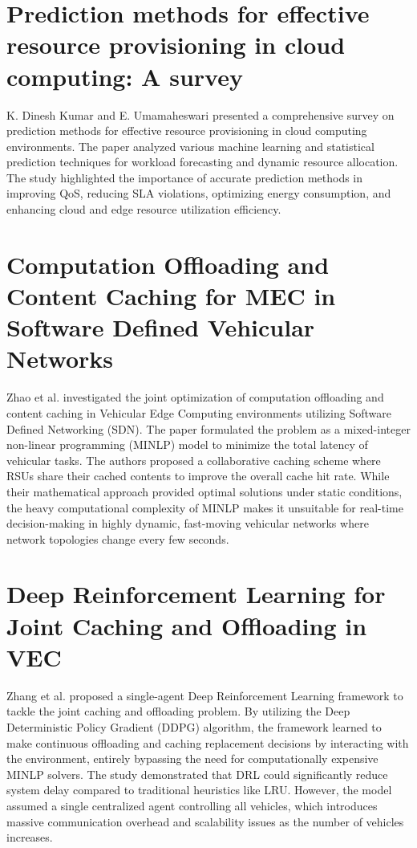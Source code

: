 \documentclass[12pt,a4paper]{report}
\begin{document}
\section{Prediction methods for effective resource provisioning in cloud computing: A survey}
K. Dinesh Kumar and E. Umamaheswari presented a comprehensive survey on prediction methods for effective resource provisioning in cloud computing environments. The paper analyzed various machine learning and statistical prediction techniques for workload forecasting and dynamic resource allocation. The study highlighted the importance of accurate prediction methods in improving QoS, reducing SLA violations, optimizing energy consumption, and enhancing cloud and edge resource utilization efficiency.

\section{Computation Offloading and Content Caching for MEC in Software Defined Vehicular Networks}
Zhao et al. investigated the joint optimization of computation offloading and content caching in Vehicular Edge Computing environments utilizing Software Defined Networking (SDN). The paper formulated the problem as a mixed-integer non-linear programming (MINLP) model to minimize the total latency of vehicular tasks. The authors proposed a collaborative caching scheme where RSUs share their cached contents to improve the overall cache hit rate. While their mathematical approach provided optimal solutions under static conditions, the heavy computational complexity of MINLP makes it unsuitable for real-time decision-making in highly dynamic, fast-moving vehicular networks where network topologies change every few seconds.

\section{Deep Reinforcement Learning for Joint Caching and Offloading in VEC}
Zhang et al. proposed a single-agent Deep Reinforcement Learning framework to tackle the joint caching and offloading problem. By utilizing the Deep Deterministic Policy Gradient (DDPG) algorithm, the framework learned to make continuous offloading and caching replacement decisions by interacting with the environment, entirely bypassing the need for computationally expensive MINLP solvers. The study demonstrated that DRL could significantly reduce system delay compared to traditional heuristics like LRU. However, the model assumed a single centralized agent controlling all vehicles, which introduces massive communication overhead and scalability issues as the number of vehicles increases.
\end{document}
